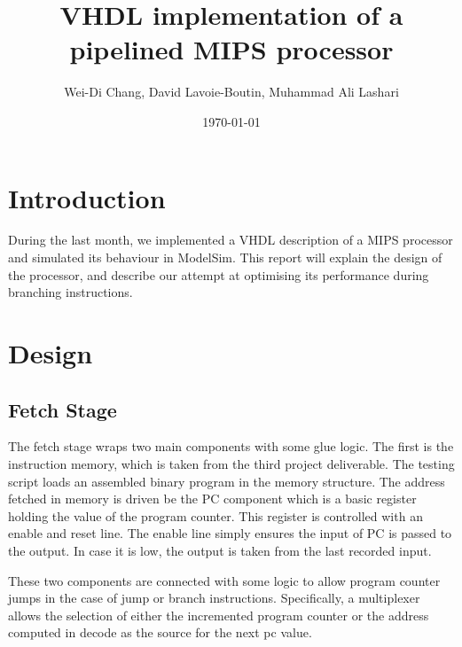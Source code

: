 \documentclass[12pt]{IEEEtran} %
\title{VHDL implementation of a pipelined MIPS processor}
\date{\today}
\author{Wei-Di Chang, David Lavoie-Boutin, Muhammad Ali Lashari}
\begin{document}

\section{Introduction} %
\label{sec:introduction}

During the last month, we implemented a VHDL description of a MIPS processor and simulated its behaviour in ModelSim. This report will explain the design of the processor, and describe our attempt at optimising its performance during branching instructions. 

\section{Design} %
\label{sec:design}

\subsection{Fetch Stage} %
\label{sub:fetch_stage}
The fetch stage wraps two main components with some glue logic. The first is the instruction memory, which is taken from the third project deliverable. The testing script loads an assembled binary program in the memory structure. The address fetched in memory is driven be the PC component which is a basic register holding the value of the program counter. This register is controlled with an enable and reset line. The enable line simply ensures the input of PC is passed to the output. In case it is low, the output is taken from the last recorded input.

These two components are connected with some logic to allow program counter jumps in the case of jump or branch instructions. Specifically, a multiplexer allows the selection of either the incremented program counter or the address computed in decode as the source for the next pc value.  
\end{document}
